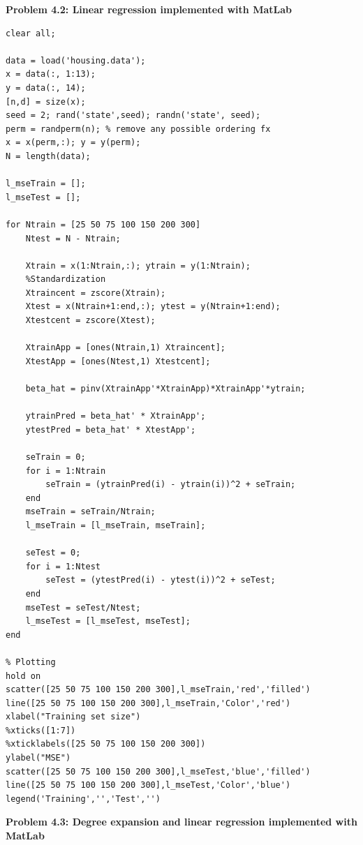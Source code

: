 \documentclass[11pt]{article}
\begin{document}
\textbf{Problem 4.2: Linear regression implemented with MatLab}\\
\begin{verbatim}
clear all;

data = load('housing.data');
x = data(:, 1:13);
y = data(:, 14);
[n,d] = size(x);
seed = 2; rand('state',seed); randn('state', seed);
perm = randperm(n); % remove any possible ordering fx
x = x(perm,:); y = y(perm);
N = length(data);

l_mseTrain = [];
l_mseTest = [];

for Ntrain = [25 50 75 100 150 200 300]
    Ntest = N - Ntrain;

    Xtrain = x(1:Ntrain,:); ytrain = y(1:Ntrain);
    %Standardization
    Xtraincent = zscore(Xtrain); 
    Xtest = x(Ntrain+1:end,:); ytest = y(Ntrain+1:end);
    Xtestcent = zscore(Xtest);

    XtrainApp = [ones(Ntrain,1) Xtraincent];
    XtestApp = [ones(Ntest,1) Xtestcent];

    beta_hat = pinv(XtrainApp'*XtrainApp)*XtrainApp'*ytrain;

    ytrainPred = beta_hat' * XtrainApp';
    ytestPred = beta_hat' * XtestApp';

    seTrain = 0;
    for i = 1:Ntrain
        seTrain = (ytrainPred(i) - ytrain(i))^2 + seTrain;
    end
    mseTrain = seTrain/Ntrain;
    l_mseTrain = [l_mseTrain, mseTrain];

    seTest = 0;
    for i = 1:Ntest
        seTest = (ytestPred(i) - ytest(i))^2 + seTest;
    end
    mseTest = seTest/Ntest;
    l_mseTest = [l_mseTest, mseTest];
end

% Plotting
hold on
scatter([25 50 75 100 150 200 300],l_mseTrain,'red','filled')
line([25 50 75 100 150 200 300],l_mseTrain,'Color','red')
xlabel("Training set size")
%xticks([1:7])
%xticklabels([25 50 75 100 150 200 300])
ylabel("MSE")
scatter([25 50 75 100 150 200 300],l_mseTest,'blue','filled')
line([25 50 75 100 150 200 300],l_mseTest,'Color','blue')
legend('Training','','Test','')
\end{verbatim}

\textbf{Problem 4.3: Degree expansion and linear regression implemented with MatLab}\\
\end{document}
